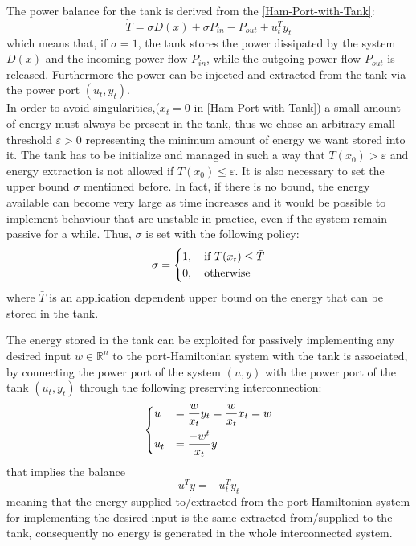 The power balance for the tank is derived from the \eqref{Ham-Port-with-Tank}:
\begin{equation}\label{Tank-power-balance}
	\dot{T}=\sigma D(x) + \sigma P_{in} - P_{out} + u^{T}_{t}y_{t}
\end{equation}
which means that, if $\sigma = 1$, the tank stores the power dissipated by the system $D(x)$ and the incoming power flow $P_{in}$, while the outgoing power flow $P_{out}$ is released.
Furthermore the power can be injected and extracted from the tank via the power port $(u_{t}, y_{t})$.\\
In order to avoid singularities,($x_{t} = 0$ in \eqref{Ham-Port-with-Tank}) a small amount of energy must always be present in the tank, thus we chose an arbitrary small threshold $\varepsilon > 0$ representing the minimum amount of energy we want stored into it.
The tank has to be initialize and managed in such a way that $T(x_{0}) > \varepsilon$ and energy extraction is not allowed if $T(x_{0}) \leq \varepsilon$. It is also necessary to set the upper bound $\sigma$ mentioned before. In fact, if there is no bound, the energy available can become very large as time increases and it would be possible to implement behaviour that are unstable in practice, even if the system remain passive for a while.
Thus, $\sigma$ is set with the following policy:
\begin{equation}
	\sigma =
		\begin{dcases}
			1, \quad \mbox{if} \ T(x_{t}) \leq \bar{T}\\
			0, \quad \mbox{otherwise}
		\end{dcases}
\end{equation}
where $\bar{T}$ is an application dependent upper bound on the energy that can be stored in the tank.

The energy stored in the tank can be exploited for passively implementing any desired input $w \in \mathbb{R}^{n}$ to the port-Hamiltonian system with the tank is associated, by connecting the power port of the system $(u, y)$ with the power port of the tank $(u_{t}, y_{t})$ through the following preserving interconnection:
\begin{equation}\label{tank_power_preserving_interconnection}
	\begin{dcases}
		u &= \dfrac{w}{x_{t}}y_{t} = \dfrac{w}{x_{t}}x_{t} = w\\
		u_{t} &= \dfrac{-w^{t}}{x_{t}}y
 	\end{dcases}
\end{equation}
that implies the balance
\begin{equation}
	u^{T}y = -u^{T}_{t}y_{t}
\end{equation}
meaning that the energy supplied to/extracted from the port-Hamiltonian system for implementing the desired input is the same extracted from/supplied to the tank, consequently no energy is generated in the whole interconnected system.
